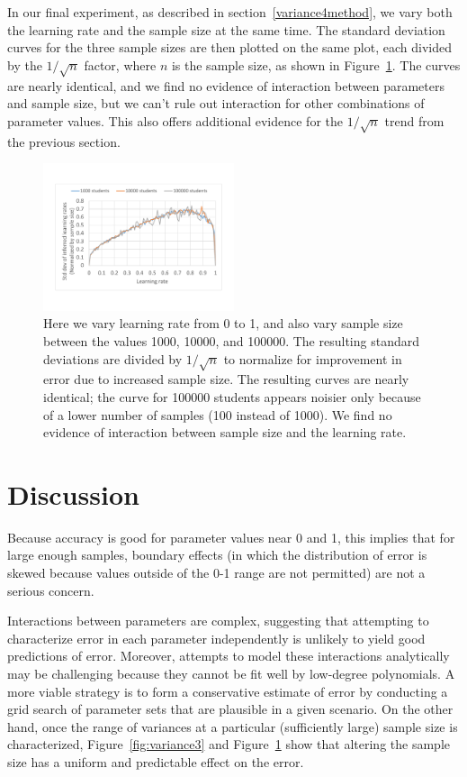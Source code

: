 \documentclass{edm_template}
\begin{document}
In our final experiment, as described in section~\ref{variance4method}, we vary both the learning rate and the sample size at the same time. The standard deviation curves for the three sample sizes are then plotted on the same plot, each divided by the $1/\sqrt{n}$ factor, where $n$ is the sample size, as shown in Figure~\ref{fig:variance4}. The curves are nearly identical, and we find no evidence of interaction between parameters and sample size, but we can't rule out interaction for other combinations of parameter values. This also offers additional evidence for the $1/\sqrt{n}$ trend from the previous section.

\begin{figure}
\centering
\includegraphics[width=0.5\textwidth]{data/variance4.pdf}
\caption{Here we vary learning rate from 0 to 1, and also vary sample size between the values 1000, 10000, and 100000. The resulting standard deviations are divided by $1/\sqrt{n}$ to normalize for improvement in error due to increased sample size. The resulting curves are nearly identical; the curve for 100000 students appears noisier only because of a lower number of samples (100 instead of 1000). We find no evidence of interaction between sample size and the learning rate.}
\label{fig:variance4}
\end{figure}

\section{Discussion}

Because accuracy is good for parameter values near 0 and 1, this implies that for large enough samples, boundary effects (in which the distribution of error is skewed because values outside of the 0-1 range are not permitted) are not a serious concern.

Interactions between parameters are complex, suggesting that attempting to characterize error in each parameter independently is unlikely to yield good predictions of error. Moreover, attempts to model these interactions analytically may be challenging because they cannot be fit well by low-degree polynomials. A more viable strategy is to form a conservative estimate of error by conducting a grid search of parameter sets that are plausible in a given scenario. On the other hand, once the range of variances at a particular (sufficiently large) sample size is characterized, Figure~\ref{fig:variance3} and Figure~\ref{fig:variance4} show that altering the sample size has a uniform and predictable effect on the error.
\end{document}
